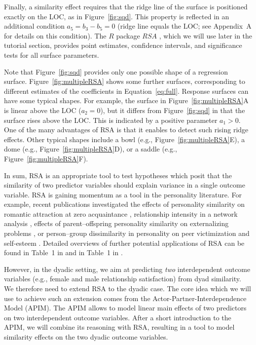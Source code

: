 \documentclass[jou,a4paper,draftfirst]{apa6}
\begin{document}
Finally, a similarity effect requires that the ridge line of the surface is positioned exactly on the LOC, as in Figure~\ref{fig:sqd}. This property is reflected in an additional condition $a_5 = b_3 - b_5 = 0$ (ridge line equals the LOC; see Appendix~A for details on this condition). The $R$ package $RSA$ \parencite{schonbrodt_rsa:_2016}, which we will use later in the tutorial section, provides point estimates, confidence intervals, and significance tests for all surface parameters.

Note that Figure~\ref{fig:sqd} provides only one possible shape of a regression surface. Figure~\ref{fig:multipleRSA} shows some further surfaces, corresponding to different estimates of the coefficients in Equation~\ref{eq:full}. Response surfaces can have some typical shapes. For example, the surface in Figure~\ref{fig:multipleRSA}A is linear above the LOC ($a_2=0$), but it differs from Figure~\ref{fig:sqd} in that the surface rises above the LOC. This is indicated by a positive parameter $a_1 > 0$. One of the many advantages of RSA is that it enables to detect such rising ridge effects.
Other typical shapes include a bowl (e.g., Figure~\ref{fig:multipleRSA}E), a dome (e.g., Figure~\ref{fig:multipleRSA}D), or a saddle (e.g., Figure~\ref{fig:multipleRSA}F).

In sum, RSA is an appropriate tool to test hypotheses which posit that the similarity of two predictor variables should explain variance in a single outcome variable.
RSA is gaining momentum as a tool in the personality literature. For example, recent publications investigated the effects of personality similarity on romantic attraction at zero acquaintance \parencite{olderbak_predicting_2017}, relationship intensity in a network analysis \parencite{ilmarinen_homophilous_2017}, effects of parent–offspring personality similarity on externalizing problems \parencite{franken_using_2017}, or person–group dissimilarity in personality on peer victimization \parencite{boele_persongroup_2017} and self-esteem \parencite{Bleidorn_2016}. Detailed overviews of further potential applications of RSA can be found in Table~1 in \textcite{Barranti__2017} and in Table~1 in \textcite{HumbergRSA}.

However, in the dyadic setting, we aim at predicting \emph{two} interdependent outcome variables (e.g., female and male relationship satisfaction) from dyad similarity. We therefore need to extend RSA to the dyadic case. The core idea which we will use to achieve such an extension comes from the Actor-Partner-Interdependence Model (APIM). The APIM allows to model linear main effects of two predictors on two interdependent outcome variables. After a short introduction to the APIM, we will combine its reasoning with RSA, resulting in a tool to model similarity effects on the two dyadic outcome variables.
\end{document}
